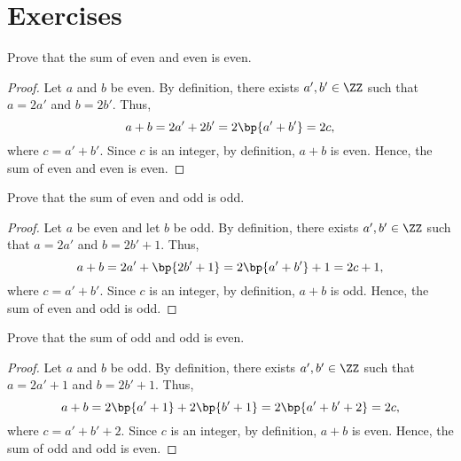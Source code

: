 \section{Exercises}

\begin{problem}
    Prove that the sum of even and even is even.
\end{problem}
\begin{proof}
    Let $a$ and $b$ be even. By definition, there exists $a', b' \in \ZZ$ such that $a = 2a'$ and $b = 2b'$. Thus, \[a + b = 2a' + 2b' = 2\bp{a' + b'} = 2c,\] where $c = a' + b'$. Since $c$ is an integer, by definition, $a + b$ is even. Hence, the sum of even and even is even.
\end{proof}

\begin{problem}
    Prove that the sum of even and odd is odd.
\end{problem}
\begin{proof}
    Let $a$ be even and let $b$ be odd. By definition, there exists $a', b' \in \ZZ$ such that $a = 2a'$ and $b = 2b' + 1$. Thus, \[a + b = 2a' + \bp{2b' + 1} = 2\bp{a' + b'} + 1 = 2c + 1,\] where $c = a' + b'$. Since $c$ is an integer, by definition, $a + b$ is odd. Hence, the sum of even and odd is odd.
\end{proof}

\begin{problem}
    Prove that the sum of odd and odd is even.
\end{problem}
\begin{proof}
    Let $a$ and $b$ be odd. By definition, there exists $a', b' \in \ZZ$ such that $a = 2a' + 1$ and $b = 2b' + 1$. Thus, \[a + b = 2\bp{a' + 1} + 2\bp{b' + 1} = 2\bp{a' + b' + 2} = 2c,\] where $c = a' + b' + 2$. Since $c$ is an integer, by definition, $a + b$ is even. Hence, the sum of odd and odd is even.
\end{proof}